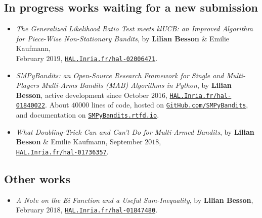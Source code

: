 \subsection{In progress works waiting for a new submission}

\begin{itemize}

\item
    \emph{The Generalized Likelihood Ratio Test meets klUCB: an Improved Algorithm for Piece-Wise Non-Stationary Bandits},
    by \textbf{Lilian Besson} \& Emilie Kaufmann, \\
    February $2019$,
    \href{https://HAL.Inria.fr/hal-02006471}{\texttt{HAL.Inria.fr/hal-02006471}}.
    \cite{Besson2019GLRT}

\item
    \emph{SMPyBandits: an Open-Source Research Framework for Single and Multi-Players Multi-Arms Bandits (MAB) Algorithms in Python},
    by \textbf{Lilian Besson}, active development since October $2016$,
    \href{https://HAL.Inria.fr/hal-01840022}{\texttt{HAL.Inria.fr/hal-01840022}}.
    About $40000$ lines of code, hosted on \href{https://GitHub.com/SMPyBandits}{\texttt{GitHub.com/SMPyBandits}},
    and documentation on \href{https://SMPyBandits.rtfd.io}{\texttt{SMPyBandits.rtfd.io}}.
    \cite{SMPyBandits,SMPyBanditsJMLR}

\item
    \emph{What Doubling-Trick Can and Can't Do for Multi-Armed Bandits},
    by \textbf{Lilian Besson} \& Emilie Kaufmann,
    September $2018$,\\
    \href{https://HAL.Inria.fr/hal-01736357}{\texttt{HAL.Inria.fr/hal-01736357}}.
    \cite{Besson2018DoublingTricks}

\end{itemize}


\subsection{Other works}

\begin{itemize}
\item
    \emph{A Note on the Ei Function and a Useful Sum-Inequality},
    by \textbf{Lilian Besson},
    February $2018$,
    \href{https://HAL.Inria.fr/hal-01847480}{\texttt{HAL.Inria.fr/hal-01847480}}.

\end{itemize}


